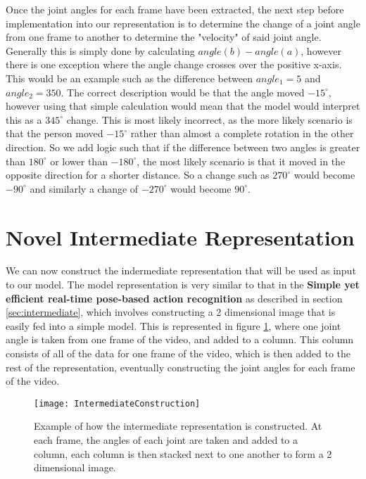 Once the joint angles for each frame have been extracted, the next step before implementation into our representation is to determine the change of a joint angle from one frame to another to determine the "velocity" of said joint angle. Generally this is simply done by calculating $angle(b) - angle(a)$, however there is one exception where the angle change crosses over the positive x-axis. This would be an example such as the difference between $angle_1 = 5$ and $angle_2 = 350$. The correct description would be that the angle moved $-15^\circ$, however using that simple calculation would mean that the model would interpret this as a $345^\circ$ change. This is most likely incorrect, as the more likely scenario is that the person moved $-15^\circ$ rather than almost a complete rotation in the other direction. So we add logic such that if the difference between two angles is greater than $180^\circ$ or lower than $-180^\circ$, the most likely scenario is that it moved in the opposite direction for a shorter distance. So a change such as $270^\circ$ would become $-90^\circ$ and similarly a change of $-270^\circ$ would become $90^\circ$.

\section{Novel Intermediate Representation}

We can now construct the indermediate representation that will be used as input to our model. The model representation is very similar to that in the \textbf{Simple yet efficient real-time pose-based action recognition} \cite{simple_yet_efficient} as described in section \ref{sec:intermediate}, which involves constructing a 2 dimensional image that is easily fed into a simple model. This is represented in figure \ref{fig:intermediate-construction}, where one joint angle is taken from one frame of the video, and added to a column. This column consists of all of the data for one frame of the video, which is then added to the rest of the representation, eventually constructing the joint angles for each frame of the video.

\begin{figure}[ht]
	\texttt{[image: IntermediateConstruction]}
	\centering
	\caption{Example of how the intermediate representation is constructed. At each frame, the angles of each joint are taken and added to a column, each column is then stacked next to one another to form a 2 dimensional image.}
	\label{fig:intermediate-construction}
\end{figure}

